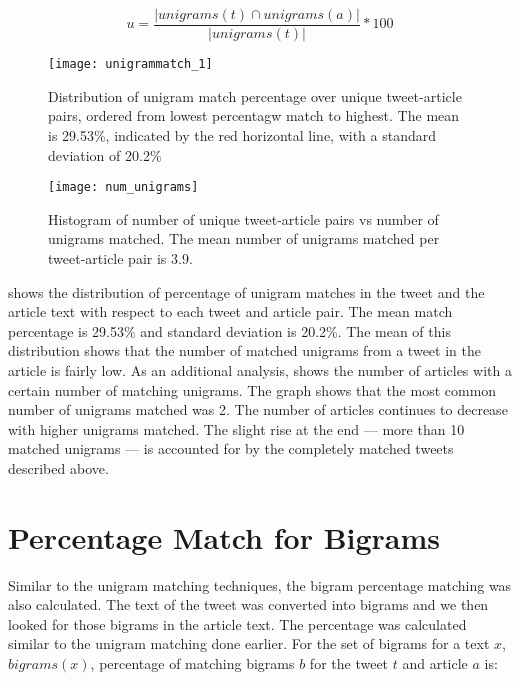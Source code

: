 \begin{equation}
u = \frac{| \textit{unigrams}(t) \cap \textit{unigrams}(a) |}{| \textit{unigrams}(t) |} * 100
\end{equation}

\begin{figure}[!t]
\centering
\texttt{[image: unigrammatch\_1]}
\caption[Unigram matching percentages]{Distribution of unigram match percentage over unique tweet-article pairs, ordered from lowest percentagw match to highest. The mean is 29.53\%, indicated by the red horizontal line, with a standard deviation of 20.2\%}
\label{fig:unigrammatch}
\end{figure}


\begin{figure}[!t]
\centering
\texttt{[image: num\_unigrams]}
\caption[Histogram for absolute number of unigrams matched]{Histogram of number of unique tweet-article pairs vs number of unigrams matched. The mean number of unigrams matched per tweet-article pair is 3.9.}
\label{fig:num_unigrams}
\end{figure}

 shows the distribution of percentage of unigram matches in the tweet and the article text with respect to each tweet and article pair. The mean match percentage is 29.53\% and standard deviation is 20.2\%. The mean of this distribution shows that the number of matched unigrams from a tweet in the article is fairly low. As an additional analysis,  shows the number of articles with a certain number of matching unigrams. The graph shows that the most common number of unigrams matched was 2. The number of articles continues to decrease with higher unigrams matched. The slight rise at the end --- more than 10 matched unigrams --- is accounted for by the completely matched tweets described above.


\section{Percentage Match for Bigrams}
\label{sec:bigrams}

Similar to the unigram matching techniques, the bigram percentage matching was also calculated. The text of the tweet was converted into bigrams and we then looked for those bigrams in the article text. The percentage was calculated similar to the unigram matching done earlier. For the set of bigrams for a text $x$, $\textit{bigrams}(x)$, percentage of matching bigrams $b$ for the tweet $t$ and article $a$ is: 

